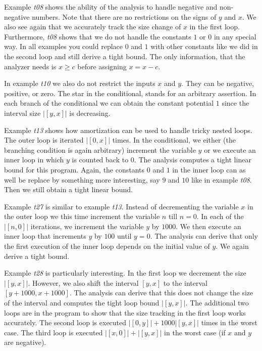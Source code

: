 \documentclass[nocopyrightspace,preprint,pldi]{sigplanconf-pldi15}
\begin{document}
{Example \emph{t08} shows the ability of the analysis to handle
negative and non-negative numbers.  Note that there are no
restrictions on the signs of $y$ and $x$.  We also see again that we
accurately track the size change of $x$ in the first loop.
Furthermore, \emph{t08} shows that we do not handle the constants $1$
or $0$ in any special way.  In all examples you could replace $0$ and
$1$ with other constants like we did in the second loop and still
derive a tight bound.  The only information, that the analyzer needs
is $x \geq c$ before assigning $x = x - c$.

In example \emph{t10} we also do not restrict the inputs $x$ and $y$.
They can be negative, positive, or zero.  The star {\tt *} in the
conditional, stands for an arbitrary assertion.  In each branch of the
conditional we can obtain the constant potential $1$ since the interval
size $|[y,x]|$ is decreasing.

Example \emph{t13} shows how amortization can be used to handle tricky
nested loops.  The outer loop is iterated $|[0,x]|$ times.  In the
conditional, we either (the branching condition is again arbitrary)
increment the variable $y$ or we execute an inner loop in which $y$ is
counted back to $0$.  The analysis computes a tight linear bound for
this program.  Again, the constants $0$ and $1$ in the inner loop can
as well be replace by something more interesting, say $9$ and $10$
like in example \emph{t08}.  Then we still obtain a tight linear
bound.

Example \emph{t27} is similar to example \emph{t13}.  Instead of
decrementing the variable $x$ in the outer loop we this time increment
the variable $n$ till $n = 0$.  In each of the $|[n,0]|$ iterations,
we increment the variable $y$ by $1000$.  We then execute an inner
loop that increments $y$ by $100$ until $y=0$.  The analysis can
derive that only the first execution of the inner loop depends on the
initial value of $y$.  We again derive a tight bound.

Example \emph{t28} is particularly interesting.  In the first loop we
decrement the size $|[y,x]|$.  However, we also shift the interval
$[y,x]$ to the interval $[y+1000,x+1000]$.  The analysis can derive
that this does not change the size of the interval and computes the
tight loop bound $|[y,x]|$.  The additional two loops are in the
program to show that the size tracking in the first loop works
accurately.  The second loop is executed $|[0,y]| + 1000|[y,x]|$ times
in the worst case.  The third loop is executed $|[x,0]| + |[y,x]|$ in
the worst case (if $x$ and $y$ are negative).

}
\end{document}
